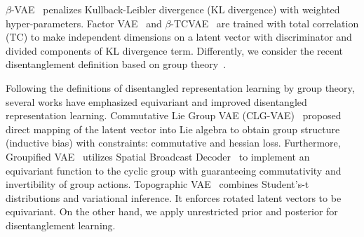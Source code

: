 $\beta$-VAE~\cite{betaVAE} penalizes Kullback-Leibler divergence (KL divergence) with weighted hyper-parameters.
Factor VAE~\cite{factor-vae} and $\beta$-TCVAE~\cite{beta-tcvae} are trained with total correlation (TC) to make independent dimensions on a latent vector with discriminator and divided components of KL divergence term.
Differently, we consider the recent disentanglement definition based on group theory~\cite{disen_definitiaon_2}.

Following the definitions of disentangled representation learning by group theory, several works have emphasized equivariant and improved disentangled representation learning.
Commutative Lie Group VAE (CLG-VAE)~\cite{commutative-vae} proposed direct mapping of the latent vector into Lie algebra to obtain group structure (inductive bias) with constraints: commutative and hessian loss.
Furthermore, Groupified VAE~\cite{groupified-vae} utilizes Spatial Broadcast Decoder~\cite{broadcast-decoder} to implement an equivariant function to the cyclic group with guaranteeing commutativity and invertibility of group actions.
Topographic VAE~\cite{t-vae} combines Student's-t distributions and variational inference. 
It enforces rotated latent vectors to be equivariant.
On the other hand, we apply unrestricted prior and posterior for disentanglement learning.

